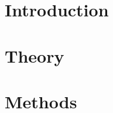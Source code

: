 \documentclass[a4paper, 12pt, openany]{book} %
\begin{document}

\pagestyle{fancy} %
\fancyhf{} %
\renewcommand{\headrulewidth}{0pt} %
\fancyhead[LE, RO]{\thepage} %
\fancyhead[RE, LO]{\leftmark} %
\setlength{\headheight}{14.49998pt} %



\chapter{Introduction}
\label{ch:introduction}

\cleardoublepage


% 

\chapter{Theory}
\label{ch:theory}

\cleardoublepage


\chapter{Methods}
\label{ch:method}

\cleardoublepage

% 
\end{document}
